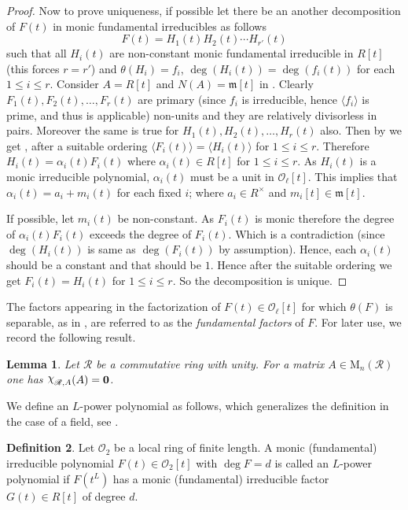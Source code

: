 \documentclass[11pt,twoside]{amsart}
\newcommand{\M}{\mathrm{M}}
\newcommand{\upchi}{\raisebox{0.4ex}{$\chi$}}
\newcommand{\Char}{\upchi}
\newcommand{\R}{\mathscr{O}_2}
\newtheorem{lemma}{Lemma}[section]
\theoremstyle{definition} %
\newtheorem{definition}[lemma]{Definition}
\begin{document}
\begin{proof}
Now to prove uniqueness, if possible let there be an another decomposition of $F(t)$ in monic fundamental irreducibles as follows $$F(t)= H_1(t)H_2(t)\cdots H_{r'}(t)$$ such that all $H_i(t)$ are non-constant monic fundamental irreducible in $R[t]$ (this forces $r=r'$) and $\theta({H_i})=f_i$, $\deg(H_i(t))=\deg(f_i(t))$ for each $1\leq i\leq r$.
Consider $A=R[t]$ and $N(A)=\mathfrak{m}[t]$ in .
Clearly $F_1(t), F_2(t),\ldots, F_r(t)$ are primary (since $f_i$ is irreducible, hence $\langle f_i\rangle$ is prime, and thus  is applicable) non-units and they are relatively divisorless in pairs.
Moreover the same is true for $H_1(t),H_2(t),\ldots,H_r(t)$ also.
Then by   we get , after a suitable ordering $\langle F_i(t)\rangle=\langle H_i(t)\rangle$ for $1\leq i\leq r$. 
Therefore $H_i(t)=\alpha_i(t)F_i(t)$ where $\alpha_i(t)\in R[t]$ for $1\leq i\leq r$. 
As $H_i(t)$ is a monic irreducible polynomial, $\alpha_i(t)$ must be a unit in $\mathscr O_\ell[t]$.
This implies that $\alpha_i(t)=a_i+m_i(t)$ for each fixed $i$; where $a_i\in R^{\times}$ and $m_i[t]\in \mathfrak{m}[t].$ 

If possible, let $m_i(t)$ be non-constant.
As $F_i(t)$ is monic therefore the degree of $\alpha_i(t)F_i(t)$ exceeds the degree of $F_i(t)$. Which is a contradiction (since $\deg(H_i(t))$ is same as $\deg(F_i(t))$ by assumption). 
Hence, each $\alpha_i(t)$ should be a constant and that should be $1$.
Hence after the suitable ordering we get $F_i(t)=H_i(t)$ for $1\leq i\leq r$. So the decomposition is unique.
\end{proof}
The factors appearing in the factorization of $F(t) \in \mathscr O_\ell[t]$ for which $\theta(F)$ is separable, as in , are referred to as the \emph{fundamental factors} of $F$.
For later use, we record the following result.
\begin{lemma}\label{lem:cay-ham}
    Let $\mathscr R$ be a commutative ring with unity. For a matrix $A\in\M_n(\mathscr R)$ one has $\Char_{\mathscr R,A}(A)=\mathbf 0$.
\end{lemma}
We define an $L$-power polynomial as follows, which generalizes the definition in the case of a field, see \cite{KunduSinghGL}.
\begin{definition}
Let $\R$ be a local ring of finite length. A monic (fundamental) irreducible polynomial $F(t)\in \R[t]$ with $\deg F = d$ is called an $L$-power polynomial if $F(t^L)$ has a monic (fundamental) irreducible factor $G(t)\in R[t]$ of degree $d$.
\end{definition}
\end{document}
